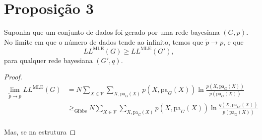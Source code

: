 \documentclass[paper=a4, fontsize=11pt]{scrartcl} %
\numberwithin{equation}{subsection}
\numberwithin{figure}{subsection}
\numberwithin{table}{subsection}
\numberwithin{definition}{subsection}
\numberwithin{theorem}{subsection}
\numberwithin{property}{subsection}
\numberwithin{proposition}{subsection}
\numberwithin{equation}{section}
\numberwithin{figure}{section}
\numberwithin{table}{section}
\numberwithin{definition}{section}
\numberwithin{theorem}{section}
\numberwithin{property}{section}
\numberwithin{proposition}{section}
\newcommand{\set}[1]{\mathcal{#1}}
\newcommand{\pa}{\ensuremath{\text{pa}}\xspace}
\begin{document}
\section{Proposição 3}

Suponha que um conjunto de dados foi gerado por uma rede bayesiana $(G, p)$. No limite em que o número 
de dados tende ao infinito, temos que $\widetilde{p} \rightarrow p$, e que
$$
LL^\text{MLE}(G) \geq LL^\text{MLE}(G'),
$$
para qualquer rede bayesiana $(G', q)$.

\begin{proof}


\begin{align*}
\lim_{\tilde{p} \rightarrow p} LL^\text{MLE}(G) 
  &= N \sum_{X \in \set{V}} \sum_{X, \pa_G(X)} p(X, \pa_G(X)) \ln \frac{p(X, \pa_G(X))}{p(\pa_G(X))} \\
  &\geq_{\text{Gibbs}} N \sum_{X \in \set{V}} \sum_{X, \pa_G(X)} p(X, \pa_G(X)) \ln \frac{q(X, \pa_{G'}(X))}{p(\pa_G(X))} \\
\end{align*}

Mas, se na estrutura 

\end{proof}
\end{document}
